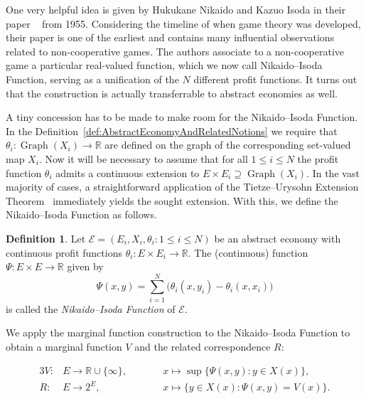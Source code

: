 \documentclass[a4paper,11pt,reqno,english]{amsart}
\theoremstyle{definition}
\newtheorem{definition}[theorem]{Definition}
\begin{document}
One very helpful idea is given by Hukukane Nikaido and Kazuo Isoda in their paper ~\cite{NikaidoIsoda1955} from 1955.
Considering the timeline of when game theory was developed, their paper is one of the earliest and contains many influential observations related to non-cooperative games.
The authors associate to a non-cooperative game a particular real-valued function, which we now call Nikaido--Isoda Function, serving as a unification of the $N$ different profit functions.
It turns out that the construction is actually transferrable to abstract economies as well.

A tiny concession has to be made to make room for the Nikaido--Isoda Function.
In the Definition~\ref{def:AbstractEconomyAndRelatedNotions} we require that $\theta_i\colon\operatorname{Graph}(X_i)\longrightarrow\mathbb{R}$ are defined on the graph of the corresponding set-valued map $X_i$.
Now it will be necessary to assume that for all $1\leq i\leq N$ the profit function $\theta_i$ admits a continuous extension to $E\times E_i \supseteq \operatorname{Graph}(X_i)$.
In the vast majority of cases, a straightforward application of the Tietze--Urysohn Extension Theorem~\cite[Thm.\,35.1]{Munkres2000} immediately yields the sought extension.
With this, we define the Nikaido--Isoda Function as follows.

\begin{definition}\label{def:NikaidoIsodaFunction}
	Let $\mathcal{E}=(E_i,X_i,\theta_i\colon 1\leq i\leq N)$ be an abstract economy with continuous profit functions $\theta_i\colon E\times E_i\longrightarrow\mathbb{R}$. The (continuous) function $\Psi\colon E\times E\longrightarrow\mathbb{R}$ given by
	\begin{displaymath}
		\Psi(x,y)=\sum_{i=1}^{N}\big(\theta_i(x,y_i)-\theta_i(x,x_i)\big)
	\end{displaymath}
	is called the \textit{Nikaido--Isoda Function} of $\mathcal{E}$.
\end{definition}

We apply the marginal function construction to the Nikaido--Isoda Function to obtain a marginal function $V$ and the related correspondence $R$:

\begin{alignat*}{3}
	V\colon & E\longrightarrow\mathbb{R}\cup\{\infty\}, & \qquad & x \longmapsto  \sup\{\Psi(x, y) \colon y\in X(x)\},    \\
	R\colon & E\longrightarrow 2^{E},                   & \qquad & x \longmapsto    \{y\in X(x)\colon \Psi(x,y) = V(x)\}.
\end{alignat*}
\end{document}
